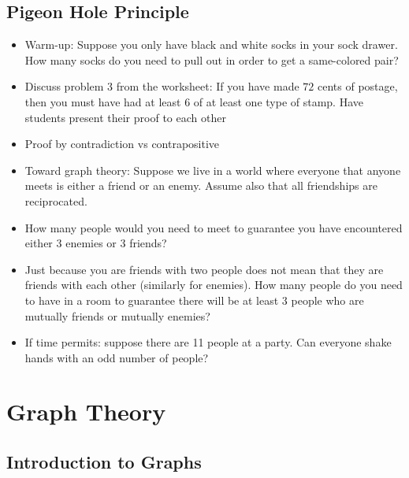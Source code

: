 \documentclass[12pt]{article}
\theoremstyle{plain}
\theoremstyle{definition}
\theoremstyle{remark}
\newcommand{\todayis}[1]{\clearpage{\rhead{\footnotesize #1}}}
\begin{document}
\subsection*{Pigeon Hole Principle}
\begin{itemize}
\item Warm-up: Suppose you only have black and white socks in your sock drawer. How many socks do you need to pull out in order to get a same-colored pair?
\item Discuss problem 3 from the worksheet: If you have made $72$ cents of postage, then you must have had at least 6 of at least one type of stamp. Have students present their proof to each other
\item Proof by contradiction vs contrapositive
\item Toward graph theory: Suppose we live in a world where everyone that anyone meets is either a friend or an enemy.  Assume also that all friendships are reciprocated.

\item How many people would you need to meet to guarantee you have encountered either 3 enemies or 3 friends?
\item Just because you are friends with two people does not mean that they are friends with each other (similarly for enemies).  How many people do you need to have in a room to guarantee there will be at least 3 people who are mutually friends or mutually enemies?
\item If time permits: suppose there are 11 people at a party. Can everyone shake hands with an odd number of people?
\end{itemize}



\todayis{Friday, November 3}
\section*{Graph Theory}

\subsection*{Introduction to Graphs}
\end{document}
